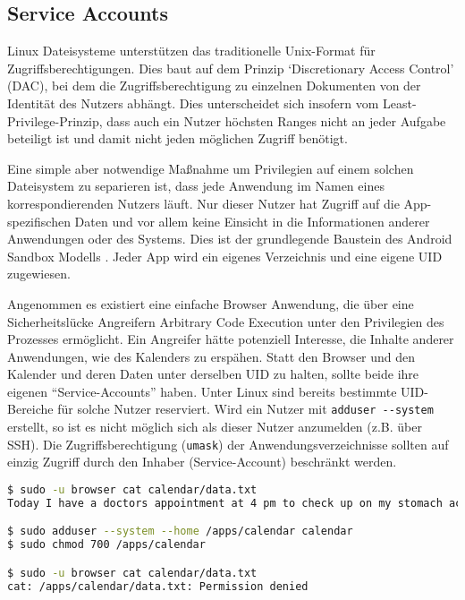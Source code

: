\subsection{Service Accounts}
\label{sec:service-acc} 

Linux Dateisysteme unterstützen das traditionelle Unix-Format für Zugriffsberechtigungen. Dies baut auf dem Prinzip `Discretionary Access Control' (DAC), bei dem die Zugriffsberechtigung zu einzelnen Dokumenten von der Identität des Nutzers abhängt. Dies unterscheidet sich insofern vom Least-Privilege-Prinzip, dass auch ein Nutzer höchsten Ranges nicht an jeder Aufgabe beteiligt ist und damit nicht jeden möglichen Zugriff benötigt.

Eine simple aber notwendige Maßnahme um Privilegien auf einem solchen Dateisystem zu separieren ist, dass jede Anwendung im Namen eines korrespondierenden Nutzers läuft. Nur dieser Nutzer hat Zugriff auf die App-spezifischen Daten und vor allem keine Einsicht in die Informationen anderer Anwendungen oder des Systems. Dies ist der grundlegende Baustein des Android Sandbox Modells \cite{android-sandbox}. Jeder App wird ein eigenes Verzeichnis und eine eigene UID zugewiesen.

Angenommen es existiert eine einfache Browser Anwendung, die über eine Sicherheitslücke Angreifern Arbitrary Code Execution unter den Privilegien des Prozesses ermöglicht. Ein Angreifer hätte potenziell Interesse, die Inhalte anderer Anwendungen, wie des Kalenders zu erspähen.
Statt den Browser und den Kalender und deren Daten unter derselben UID zu halten, sollte beide ihre eigenen ``Service-Accounts'' haben. Unter Linux sind bereits bestimmte UID-Bereiche für solche Nutzer reserviert. Wird ein Nutzer mit \texttt{adduser -{}-system} erstellt, so ist es nicht möglich sich als dieser Nutzer anzumelden (z.B. über SSH). Die Zugriffsberechtigung (\texttt{umask}) der Anwendungsverzeichnisse sollten auf einzig Zugriff durch den Inhaber (Service-Account) beschränkt werden.

\begin{lstlisting}[language=bash]
$ sudo -u browser cat calendar/data.txt
Today I have a doctors appointment at 4 pm to check up on my stomach aches.

$ sudo adduser --system --home /apps/calendar calendar
$ sudo chmod 700 /apps/calendar

$ sudo -u browser cat calendar/data.txt
cat: /apps/calendar/data.txt: Permission denied
\end{lstlisting}

